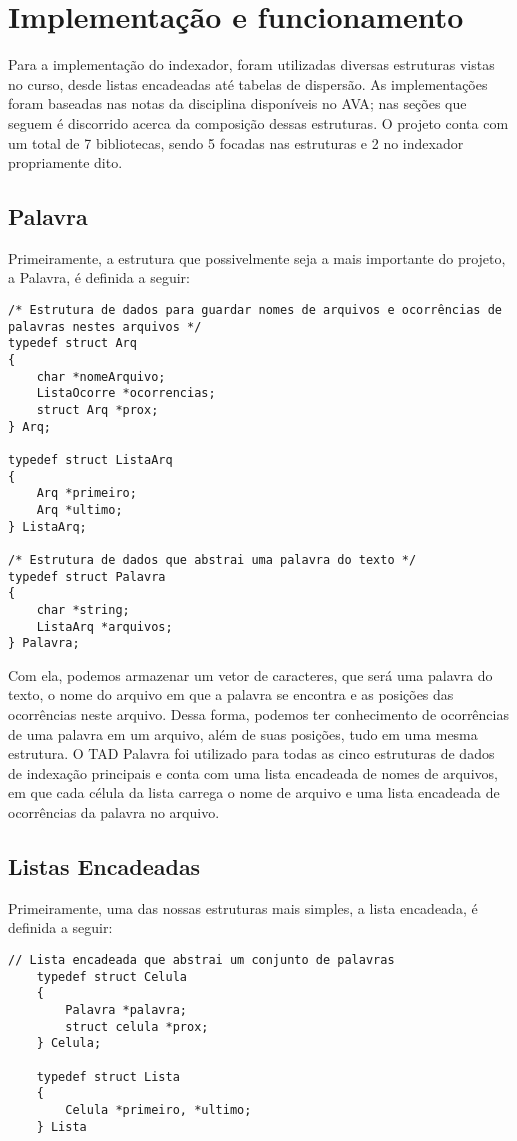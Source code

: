 \chapter{Implementação e funcionamento}\label{cap:implementacao-funcionamento}

Para a implementação do indexador, foram utilizadas diversas estruturas vistas no curso, desde listas encadeadas até tabelas de dispersão. As implementações foram baseadas nas notas da disciplina disponíveis no AVA\cite{vm-ava}; nas seções que seguem é discorrido acerca da composição dessas estruturas. O projeto conta com um total de 7 bibliotecas, sendo 5 focadas nas estruturas e 2 no indexador propriamente dito.

\section{Palavra}
Primeiramente, a estrutura que possivelmente seja a mais importante do projeto, a Palavra, é definida a seguir:
\begin{lstlisting}
/* Estrutura de dados para guardar nomes de arquivos e ocorrências de palavras nestes arquivos */
typedef struct Arq
{
    char *nomeArquivo;
    ListaOcorre *ocorrencias;
    struct Arq *prox;
} Arq;

typedef struct ListaArq
{
    Arq *primeiro;
    Arq *ultimo;
} ListaArq;

/* Estrutura de dados que abstrai uma palavra do texto */
typedef struct Palavra
{
    char *string;
    ListaArq *arquivos;
} Palavra;
\end{lstlisting}

Com ela, podemos armazenar um vetor de caracteres, que será uma palavra do texto, o nome do arquivo em que a palavra se encontra e as posições das ocorrências neste arquivo. Dessa forma, podemos ter conhecimento de ocorrências de uma palavra em um arquivo, além de suas posições, tudo em uma mesma estrutura. O TAD Palavra foi utilizado para todas as cinco estruturas de dados de indexação principais e conta com uma lista encadeada de nomes de arquivos, em que cada célula da lista carrega o nome de arquivo e uma lista encadeada de ocorrências da palavra no arquivo.

\section{Listas Encadeadas}
Primeiramente, uma das nossas estruturas mais simples, a lista encadeada, é definida a seguir:
\begin{lstlisting}
// Lista encadeada que abstrai um conjunto de palavras
    typedef struct Celula
    {
        Palavra *palavra;
        struct celula *prox;
    } Celula;

    typedef struct Lista
    {
        Celula *primeiro, *ultimo;
    } Lista
\end{lstlisting}

